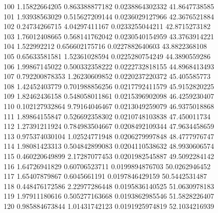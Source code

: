 {100 1.15822664205 0.863388877182 0.0238864302332 41.8647738585 \\
101 1.93938563029 0.515627209144 0.0236029127966 42.3676521884 \\
102 0.24734266715 4.04297411167 0.0233255044211 42.8715273182 \\
103 1.76012408665 0.568141762042 0.0230540154959 43.3763914221 \\
104 1.522992212 0.656602175716 0.0227882640603 43.8822368108 \\
105 0.65633581581 1.52361028594 0.0225280754249 44.3890559286 \\
106 1.99867145022 0.500332358222 0.0222732818155 44.8968413493 \\
107 0.792200878353 1.26230609852 0.0220237220372 45.405585773 \\
108 1.42452403779 0.701988856256 0.0217792411579 45.9152820225 \\
109 1.82462436158 0.548058011861 0.0215396902098 46.4259230407 \\
110 0.102127932864 9.79164046467 0.0213049259079 46.9375018868 \\
111 1.89864155847 0.526692358302 0.0210748103838 47.450011734 \\
112 1.27391211924 0.784983504667 0.0208492109344 47.9634458659 \\
113 0.975374030104 1.02524771948 0.0206279997848 48.4777976747 \\
114 1.98081423313 0.504842899083 0.0204110538632 48.9930606574 \\
115 0.460220649899 2.17287077453 0.0201982545887 49.5092284142 \\
116 1.64726941829 0.60706523711 0.0199894876703 50.0262946452 \\
117 1.65407879867 0.6045661191 0.0197846429159 50.5442531487 \\
118 0.448476172586 2.22977286448 0.0195836140525 51.0630978183 \\
119 1.97911180616 0.505277163668 0.0193862985546 51.5828226407 \\
120 0.985884673844 1.01431742123 0.0191925974819 52.1034216939 \\
}\ArithmeticProfileData

\ArithmeticHitData

